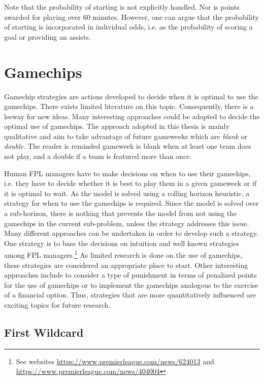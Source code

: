 Note that the probability of starting is not explicitly handled. Nor is points awarded for playing over 60 minutes. However, one can argue that the probability of starting is incorporated in individual odds, i.e. as the probability of scoring a goal or providing an assists.

\section{Gamechips} \label{Ch.5_Game_chips}

Gamechip strategies are actions developed to decide when it is optimal to use the gamechips. There exists limited literature on this topic. Consequently, there is a leeway for new ideas. Many interesting approaches could be adopted to decide the optimal use of gamechips. The approach adopted in this thesis is mainly qualitative and aim to take advantage of future gameweeks which are \textit{blank} or \textit{double}. The reader is reminded gameweek is blank when at least one team does not play, and a double if a team is featured more than once. 

\newpar

Human FPL managers have to make decisions on when to use their gamechips, i.e. they have to decide whether it is best to play them in a given gameweek or if it is optimal to wait. As the model is solved using a rolling horizon heuristic, a strategy for when to use the gamechips is required. Since the model is solved over a sub-horizon, there is nothing that prevents the model from not using the gamechips in the current sub-problem, unless the strategy addresses this issue. Many different approaches can be undertaken in order to develop such a strategy. One strategy is to base the decisions on intuition and well known strategies among FPL managers.\footnote{See websites \url{https://www.premierleague.com/news/624013} and \url{https://www.premierleague.com/news/404004}} As limited research is done on the use of gamechips, these strategies are considered an appropriate place to start. Other interesting approaches include to consider a type of punishment in terms of penalized points for the use of gamechips or to implement the gamechips analogous to the exercise of a financial option. Thus, strategies that are more quantitatively influenced are exciting topics for future research.

\subsection{First Wildcard}

